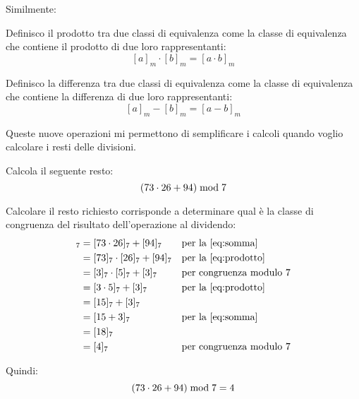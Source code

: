 Similmente:

\begin{definizione}
    Definisco il prodotto tra due classi di equivalenza come la classe di equivalenza che contiene il prodotto di due loro rappresentanti:
    \begin{equation}
        \label{eq:prodotto} [a]_m \cdot [b]_m = [a \cdot b]_m
    \end{equation}
\end{definizione}

\begin{definizione}
    Definisco la differenza tra due classi di equivalenza come la classe di equivalenza che contiene la differenza di due loro rappresentanti:
    \begin{equation}
        \label{eq:differenza} [a]_m - [b]_m = [a - b]_m
    \end{equation}
\end{definizione}

Queste nuove operazioni mi permettono di semplificare i calcoli quando voglio calcolare i resti delle divisioni.

\begin{esercizio}
    Calcola il seguente resto:
    \begin{equation*}
        (73 \cdot 26 + 94)  \bmod  7
    \end{equation*}

    Calcolare il resto richiesto corrisponde a determinare qual è la classe di congruenza del risultato dell'operazione al dividendo:
    \begin{align*}
        [73 \cdot 26 + 94]_7 &= [73 \cdot 26]_7 + [94]_7 &&\text{per la~\eqref{eq:somma}} \\
        &= [73]_7 \cdot [26]_7 + [94]_7 &&\text{per la~\eqref{eq:prodotto}} \\
        &= [3]_7 \cdot [5]_7 + [3]_7 &&\text{per congruenza modulo 7} \\
        &= [3 \cdot 5]_7 + [3]_7 &&\text{per la~\eqref{eq:prodotto}} \\
        &= [15]_7 + [3]_7 \\
        &= [15 + 3]_7 &&\text{per la~\eqref{eq:somma}} \\
        &= [18]_7 \\
        &= [4]_7 &&\text{per congruenza modulo 7}
    \end{align*}

    Quindi:
    \begin{equation*}
        (73 \cdot 26 + 94)  \bmod  7 = 4
    \end{equation*}
\end{esercizio}
